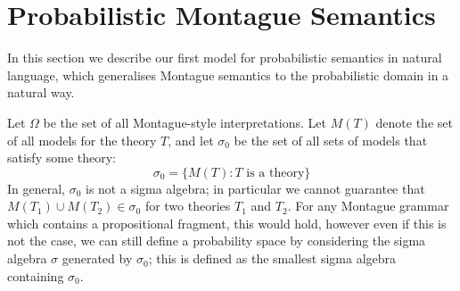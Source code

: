 \documentclass{svmult}
\begin{document}




\section{Probabilistic Montague Semantics}

In this section we describe our first model for probabilistic
semantics in natural language, which generalises Montague semantics to
the probabilistic domain in a natural way.

Let $\Omega$ be the set of all Montague-style interpretations. Let
$M(T)$ denote the set of all models for the theory $T$, and let
$\sigma_0$ be the set of all sets of models that satisfy some theory:
$$\sigma_0 = \{M(T) : T\text{ is a theory}\}$$
In general, $\sigma_0$ is not a sigma algebra; in particular we cannot
guarantee that $M(T_1)\cup M(T_2) \in \sigma_0$ for two theories $T_1$
and $T_2$. For any Montague grammar which contains a propositional
fragment, this would hold, however even if this is not the case, we
can still define a probability space by considering the sigma algebra
$\sigma$ generated by $\sigma_0$; this is defined as the smallest
sigma algebra containing $\sigma_0$.
\end{document}

